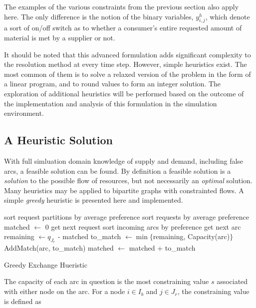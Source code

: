 The examples of the various constraints from the previous section also apply
here. The only difference is the notion of the binary variables, $y_{i,j}^{h}$,
which denote a sort of on/off switch as to whether a consumer's entire requested
amount of material is met by a supplier or not.

It should be noted that this advanced formulation adds significant complexity to
the resolution method at every time step. However, simple heuristics exist. The
most common of them is to solve a relaxed version of the problem in the form of
a linear program, and to round values to form an integer solution. The
exploration of additional heuristics will be performed based on the outcome of
the implementation and analysis of this formulation in the \Cyclus simulation
environment.

\subsection{A Heuristic Solution}

With full simluation domain knowledge of supply and demand, including false
arcs, a feasible solution can be found. By definition a feasible solution is a
\textit{solution} to the possible flow of resources, but not necessarily an
\textit{optimal} solution. Many heuristics may be applied to bipartite graphs
with constrainted flows. A simple \textit{greedy} heuristic is presented here
and implemented. 

\begin{algorithm}[h!]
 \SetAlgoLined
 sort request partitions by average preference\;
  {
   sort requests by average preference\;
   matched $\leftarrow$ 0\;        
    {
     get next request\;
     sort incoming arcs by preference\;
      {
       get next arc\;
       remaining $\leftarrow q_{J_r}$ - matched\;
       to\_match $\leftarrow \min \lbrace$remaining, Capacity(arc)$\rbrace$\;
       AddMatch(arc, to\_match)\;
       matched $\leftarrow$ matched + to\_match\;
     }
   }
 }
 \caption{Greedy Exchange Hueristic}\label{alg::greedy}
\end{algorithm}

The capacity of each arc in question is the most constraining value $s$
associated with either node on the arc. For a node $i \in I_b$ and $j \in J_r$,
the constraining value is defined as

